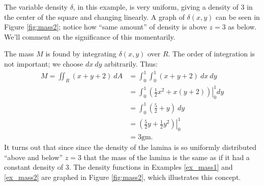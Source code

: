 {The variable density $\delta$, in this example, is very uniform, giving a density of 3 in the center of the square and changing linearly. A graph of $\delta(x,y)$ can be seen in Figure \ref{fig:mass2}; notice how ``same amount'' of density is above $z=3$ as below. We'll comment on the significance of this momentarily.

The mass $M$ is found by integrating $\delta(x,y)$ over $R$. The order of integration is not important; we choose $dx\ dy$ arbitrarily. Thus:
\begin{align*}
M = \iint_R(x+y+2)\ dA &= \int_0^1\int_0^1 (x+y+2)\ dx\ dy\\
		&= \int_0^1\left.\left(\frac 12x^2+x(y+2)\right)\right|_0^1dy\\
		&= \int_0^1 \left(\frac52+y\right)\ dy\\
		&= \left.\left(\frac52y+\frac12y^2\right)\right|_0^1\\
		&= 3\text{gm}.
\end{align*}
It turns out that since since the density of the lamina is so uniformly distributed ``above and below'' $z=3$ that the mass of the lamina is the same as if it had a constant density of 3. The density functions in Examples \ref{ex_mass1} and \ref{ex_mass2} are graphed in Figure \ref{fig:mass2}, which illustrates this concept.
}\\

